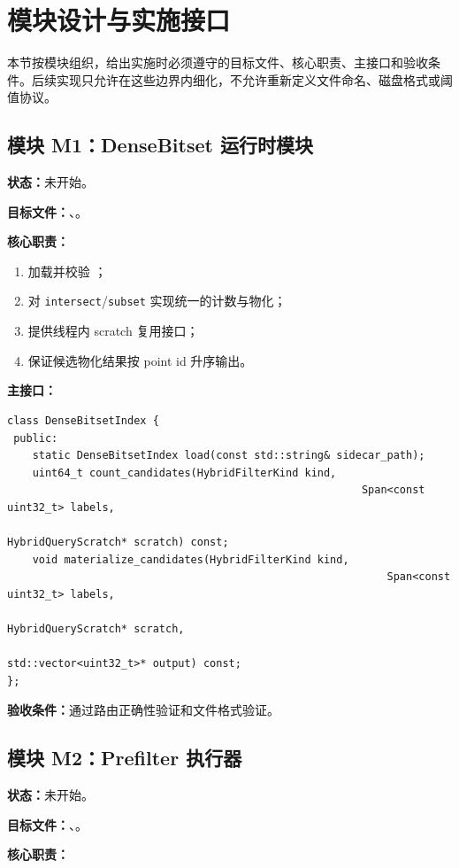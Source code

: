 \documentclass[UTF8]{ctexart}
\begin{document}
\section{模块设计与实施接口}
本节按模块组织，给出实施时必须遵守的目标文件、核心职责、主接口和验收条件。后续实现只允许在这些边界内细化，不允许重新定义文件命名、磁盘格式或阈值协议。

\subsection{模块 M1：DenseBitset 运行时模块}
\textbf{状态：}未开始。

\textbf{目标文件：}、。

\textbf{核心职责：}

\begin{enumerate}
\item 加载并校验 ；
\item 对 \texttt{intersect}/\texttt{subset} 实现统一的计数与物化；
\item 提供线程内 scratch 复用接口；
\item 保证候选物化结果按 point id 升序输出。
\end{enumerate}

\textbf{主接口：}

\begin{verbatim}
class DenseBitsetIndex {
 public:
	static DenseBitsetIndex load(const std::string& sidecar_path);
	uint64_t count_candidates(HybridFilterKind kind,
														Span<const uint32_t> labels,
														HybridQueryScratch* scratch) const;
	void materialize_candidates(HybridFilterKind kind,
															Span<const uint32_t> labels,
															HybridQueryScratch* scratch,
															std::vector<uint32_t>* output) const;
};
\end{verbatim}

\textbf{验收条件：}通过路由正确性验证和文件格式验证。

\subsection{模块 M2：Prefilter 执行器}
\textbf{状态：}未开始。

\textbf{目标文件：}、。

\textbf{核心职责：}
\end{document}
